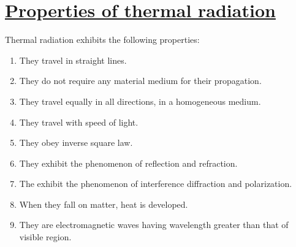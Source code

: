 \documentclass[16pt,a4paper]{article}
\begin{document}
\section{\underline{Properties of thermal radiation}}
Thermal radiation exhibits the following properties:
\begin{enumerate}
	\item They travel in straight lines.
	\item They do not require any material medium for their propagation.
	\item They travel equally in all directions, in a homogeneous medium.
	\item They travel with speed of light.
	\item They obey inverse square law.
	\item They exhibit the phenomenon of reflection and refraction.
	\item The exhibit the phenomenon of interference diffraction and polarization.
	\item When they fall on matter, heat is developed.
	\item They are electromagnetic waves having wavelength greater than that of visible region.
\end{enumerate}
\end{document}
